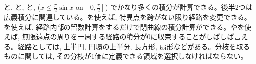 \item {}と, と, と, ($x\leq \frac{\pi}{2}\sin{x}$ on $[0,\frac{\pi}{2}]$) でかなり多くの積分が計算できる。後半2つは広義積分に関連している。を使えば, 特異点を跨がない限り経路を変更できる。を使えば, 経路内部の留数計算をするだけで閉曲線の積分計算ができる。やを使えば, 無限遠点の周りを一周する経路の積分が$0$に収束することがしばしば言える。経路としては, 上半円, 円環の上半分, 長方形, 扇形などがある。分枝を取るものに関しては, その分枝が1価に定義できる領域を選択しなければならない。
\een

\newpage
